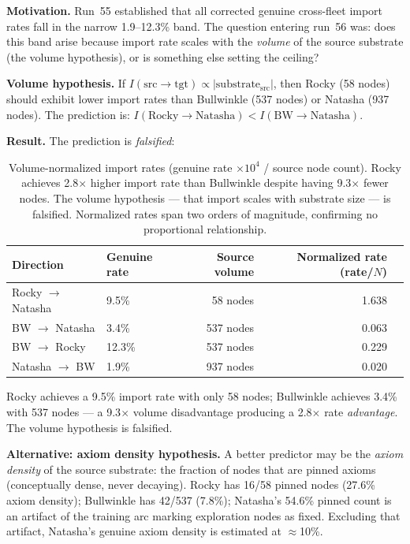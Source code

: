 \documentclass[11pt]{article}
\begin{document}
\textbf{Motivation.} Run~55 established that all corrected genuine cross-fleet import rates
fall in the narrow 1.9--12.3\% band. The question entering run~56 was: does this band arise
because import rate scales with the \emph{volume} of the source substrate (the volume
hypothesis), or is something else setting the ceiling?

\textbf{Volume hypothesis.} If $I(\text{src} \to \text{tgt}) \propto |\text{substrate}_\text{src}|$,
then Rocky (58 nodes) should exhibit lower import rates than Bullwinkle (537 nodes) or Natasha
(937 nodes). The prediction is: $I(\text{Rocky} \to \text{Natasha}) < I(\text{BW} \to \text{Natasha})$.

\textbf{Result.} The prediction is \emph{falsified}:

\begin{table}[h]
\centering
\begin{tabular}{llrrr}
\toprule
Direction & Genuine rate & Source volume & Normalized rate (rate/$N$) \\
\midrule
Rocky $\to$ Natasha  & 9.5\%  & 58 nodes  & 1.638 \\
BW $\to$ Natasha     & 3.4\%  & 537 nodes & 0.063 \\
BW $\to$ Rocky       & 12.3\% & 537 nodes & 0.229 \\
Natasha $\to$ BW     & 1.9\%  & 937 nodes & 0.020 \\
\bottomrule
\end{tabular}
\caption{Volume-normalized import rates (genuine rate $\times 10^4$ / source node count).
Rocky achieves 2.8$\times$ higher import rate than Bullwinkle despite having 9.3$\times$ fewer
nodes. The volume hypothesis --- that import scales with substrate size --- is falsified.
Normalized rates span two orders of magnitude, confirming no proportional relationship.}
\end{table}

Rocky achieves a 9.5\% import rate with only 58 nodes; Bullwinkle achieves 3.4\%
with 537 nodes --- a 9.3$\times$ volume disadvantage producing a 2.8$\times$ rate
\emph{advantage}. The volume hypothesis is falsified.

\textbf{Alternative: axiom density hypothesis.} A better predictor may be the
\emph{axiom density} of the source substrate: the fraction of nodes that are pinned
axioms (conceptually dense, never decaying). Rocky has 16/58 pinned nodes (27.6\%
axiom density); Bullwinkle has 42/537 (7.8\%); Natasha's 54.6\% pinned count is an
artifact of the training arc marking exploration nodes as fixed. Excluding that
artifact, Natasha's genuine axiom density is estimated at $\approx$10\%.
\end{document}
